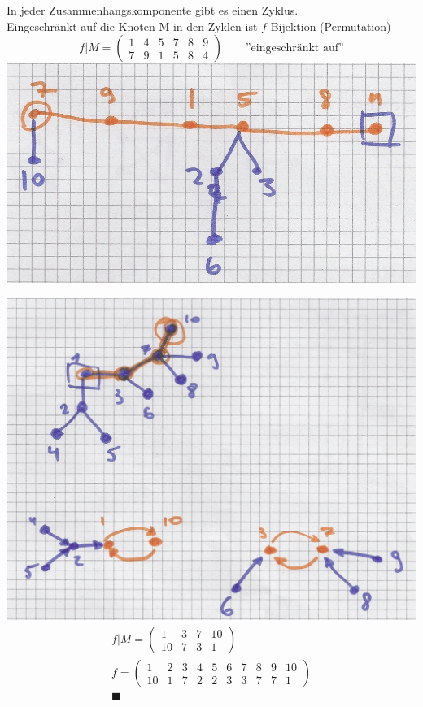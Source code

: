 \begin{satz*}[note = (Cayley)]
\begin{bew}
		In jeder Zusammenhangskomponente gibt es einen Zyklus.\\
		Eingeschränkt auf die Knoten M in den Zyklen ist $f$ Bijektion (Permutation)\\
		\[ f|M = \begin{pmatrix}
			1	&4	&5	&7	&8	&9	\\
			7	&9	&1	&5	&8	&4	
		\end{pmatrix} \qquad \text{''eingeschränkt auf''} \]
		\includegraphics[width=\textwidth]{Bild42}
	\end{bew}
	\begin{bew}[head = Beweis der Umkehrrichtung:]
		\includegraphics[width=\textwidth]{Bild43}
		\begin{gather*}
			f|M = \begin{pmatrix}
				1	&3	&7	&10	\\
				10	&7	&3	&1	
			\end{pmatrix}\\
			f = \begin{pmatrix}
				1	&2	&3	&4	&5	&6	&7	&8	&9	&10	\\
				10	&1	&7	&2	&2	&3	&3	&7	&7	&1	
			\end{pmatrix}\\
			\blacksquare
		\end{gather*}
	\end{bew}
\end{satz*}
